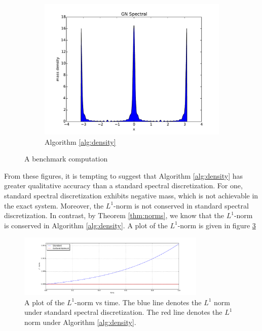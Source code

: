 \documentclass[12pt]{amsart}
\begin{document}
\begin{figure}
\begin{subfigure}{0.3\textwidth}
		\includegraphics[width=\textwidth]{./images/gn_spectral_1D.pdf}
		\caption{Algorithm \ref{alg:density}}
		\label{fig:gn spectral}
	\end{subfigure}
	\caption{A benchmark computation}
	\label{fig:S1}
\end{figure}

From these figures, it is tempting to suggest that Algorithm \ref{alg:density} has greater qualitative accuracy than a standard spectral discretization.
For one, standard spectral discretization exhibits negative mass, which is not achievable in the exact system.
Moreover, the $L^{1}$-norm is not conserved in standard spectral discretization.  In contrast, by Theorem \ref{thm:norms}, we know that
the $L^{1}$-norm is conserved in Algorithm \ref{alg:density}.
A plot of the $L^{1}$-norm is given in figure \ref{fig:L1}

\begin{figure}
	\centering
	\includegraphics[width=0.8\textwidth]{./images/L1_plot.pdf}
	\caption{A plot of the $L^{1}$-norm vs time.
		The blue line denotes the $L^{1}$ norm under standard spectral discretization.
		The red line denotes the $L^{1}$ norm under Algorithm \ref{alg:density}.
	}
	\label{fig:L1}
\end{figure}
\end{document}
